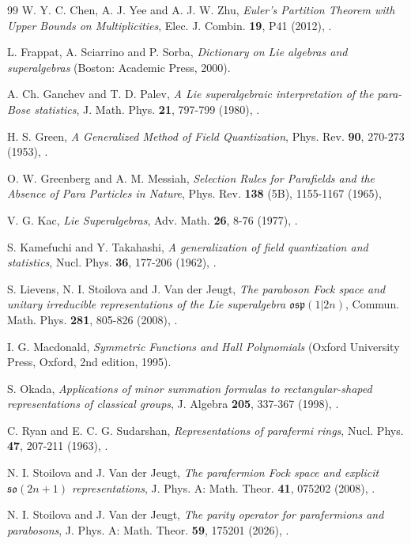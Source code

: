 \documentclass{SciPost}
\begin{document}

\begin{thebibliography}{99}
W. Y. C. Chen, A. J. Yee and A. J. W. Zhu, 
\textit{Euler's Partition Theorem with Upper Bounds on Multiplicities},
{Elec. J. Combin.} {\bf 19}, P41 (2012), .

L. Frappat, A. Sciarrino and P. Sorba,
\textit{Dictionary on Lie algebras and superalgebras}
(Boston: Academic Press, 2000).

A. Ch. Ganchev and T. D. Palev, 
\textit{A Lie superalgebraic interpretation of the para-Bose statistics},
{J. Math. Phys.} {\bf 21}, 797-799 (1980), .

H. S. Green, 
\textit{A Generalized Method of Field Quantization},
{Phys. Rev.} {\bf 90}, 270-273 (1953), .

O. W. Greenberg and A. M. Messiah,  
\textit{Selection Rules for Parafields and the Absence of Para Particles in Nature},
{Phys. Rev.} {\bf 138} (5B), 1155-1167 (1965), 

V. G. Kac,
\textit{Lie Superalgebras},
{Adv. Math.} {\bf 26}, 8-76 (1977), .

S. Kamefuchi and Y. Takahashi,
\textit{A generalization of field quantization and statistics},
{Nucl. Phys.} {\bf 36}, 177-206 (1962), .

S. Lievens, N. I. Stoilova and J. Van der Jeugt,
\textit{The paraboson Fock space and unitary irreducible representations of the Lie superalgebra $\mathfrak{osp}(1|2n)$},
{Commun. Math. Phys.} {\bf 281}, 805-826 (2008), .

I. G. Macdonald, \textit{Symmetric Functions and Hall Polynomials} (Oxford University Press, Oxford, 2nd edition, 1995). 

S. Okada, \textit{Applications of minor summation formulas to rectangular-shaped representations of classical groups}, 
{J. Algebra} {\bf 205}, 337-367 (1998), .

C. Ryan and E. C. G. Sudarshan, 
\textit{Representations of parafermi rings},
{Nucl. Phys.} {\bf 47}, 207-211 (1963), .

N. I. Stoilova and J. Van der Jeugt, 
\textit{The parafermion Fock space and explicit $\mathfrak{so}(2n+1)$ representations},
{J. Phys. A: Math. Theor.} {\bf 41}, 075202 (2008), .

N. I. Stoilova and J. Van der Jeugt,
\textit{The parity operator for parafermions and parabosons},
{J. Phys. A: Math. Theor.} {\bf 59}, 175201 (2026), .

\end{thebibliography}

%

\end{document}
